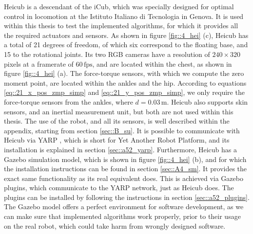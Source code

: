 \label{sec::4_he}
Heicub is a descendant of the iCub, which was specially designed for optimal control in locomotion at the Istituto Italiano di Tecnologia in Genova. It is used within this thesis to test the implemented algorithms, for which it provides all the required actuators and sensors. As shown in figure \ref{fig::4_hei} (c), Heicub has a total of 21 degrees of freedom, of which six correspond to the floating base, and 15 to the rotational joints. Its two RGB cameras have a resolution of $240\times320$ pixels at a framerate of $60\,\text{fps}$, and are located within the chest, as shown in figure \ref{fig::4_hei} (a). The force-torque sensors, with which we compute the zero moment point, are located within the ankles and the hip. According to equations \ref{eq::21_x_pos_zmp_simp} and \ref{eq::21_y_pos_zmp_simp}, we only require the force-torque sensors from the ankles, where $d=0.03\,\text{m}$. Heicub also supports skin sensors, and an inertial measurement unit, but both are not used within this thesis. The use of the robot, and all its sensors, is well described within the appendix, starting from section \ref{sec::B_su}. It is possible to communicate with Heicub via YARP \cite{metta2006yarp}, which is short for Yet Another Robot Platform, and its installation is explained in section \ref{sec::a52_yarp}. Furthermore, Heicub has a Gazebo \cite{koenig2004design} simulation model, which is shown in figure \ref{fig::4_hei} (b), and for which the installation instructions can be found in section \ref{sec::A4_sm}. It provides the exact same functionality as its real equivalent does. This is achieved via Gazebo plugins, which communicate to the YARP network, just as Heicub does. The plugins can be installed by following the instructions in section \ref{sec::a52_plugins}. The Gazebo model offers a perfect environment for software development, as we can make sure that implemented algorithms work properly, prior to their usage on the real robot, which could take harm from wrongly designed software.
